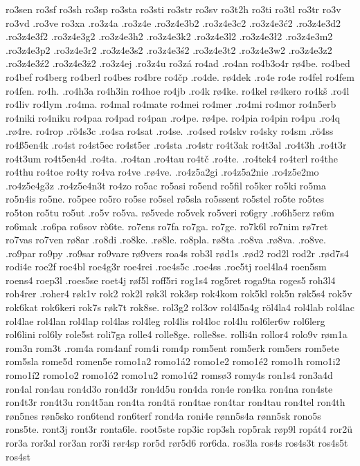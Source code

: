 {{ro3sen
ro3sf
ro3sh
ro3sp
ro3sta
ro3sti
ro3str
ro3sv
ro3t2h
ro3ti
ro3tl
ro3tr
ro3v
ro3vd
.ro3ve
ro3xa
.ro3z4a
.ro3z4e
.ro3z4e3b2
.ro3z4e3c2
.ro3z4e3ć2
.ro3z4e3d2
.ro3z4e3f2
.ro3z4e3g2
.ro3z4e3h2
.ro3z4e3k2
.ro3z4e3l2
.ro3z4e3ł2
.ro3z4e3m2
.ro3z4e3p2
.ro3z4e3r2
.ro3z4e3s2
.ro3z4e3ś2
.ro3z4e3t2
.ro3z4e3w2
.ro3z4e3z2
.ro3z4e3ź2
.ro3z4e3ż2
.ro3z4ej
.ro3z4u
ro3zá
ro4ad
.ro4an
ro4b3o4r
rø4be.
ro4bed
ro4bef
ro4berg
ro4berl
ro4bes
ro4bre
ro4čp
.ro4de.
rø4dek
.ro4e
ro4e
ro4fel
ro4fem
ro4fen.
ro4h.
.ro4h3a
ro4h3in
ro4hoe
ro4jb
.ro4k
rø4ke.
ro4kel
rø4kero
ro4kš
.ro4l
ro4liv
ro4lym
.ro4ma.
ro4mal
ro4mate
ro4mei
ro4mer
.ro4mi
ro4mor
ro4n5erb
ro4niki
ro4niku
ro4paa
ro4pad
ro4pan
.ro4pe.
rø4pe.
ro4pia
ro4pin
ro4pu
.ro4q
.rø4re.
ro4rop
.rö4s3c
.ro4sa
ro4sat
.ro4se.
.ro4sed
ro4skv
ro4sky
ro4sm
.rö4ss
ro4ß5en4k
.ro4st
ro4st5ec
ro4st5er
.ro4sta
.ro4str
ro4t3ak
ro4t3al
.ro4t3h
.ro4t3r
ro4t3um
ro4t5en4d
.ro4ta.
.ro4tan
.ro4tau
ro4tč
.ro4te.
.ro4tek4
ro4terl
ro4the
ro4thu
ro4toe
ro4ty
ro4va
ro4ve
.rø4ve.
.ro4z5a2gi
.ro4z5a2nie
.ro4z5e2mo
.ro4z5e4g3z
.ro4z5e4n3t
ro4zo
ro5ac
ro5asi
ro5end
ro5fil
ro5ker
ro5ki
ro5ma
ro5n4is
ro5ne.
ro5pee
ro5ro
ro5se
ro5sel
rø5sla
ro5ssent
ro5stel
ro5te
ro5tes
ro5ton
ro5tu
ro5ut
.ro5v
ro5va.
rø5vede
ro5vek
ro5veri
ro6gry
.ro6h5erz
rø6m
ro6mak
.ro6pa
ro6sov
rò6te.
ro7ens
ro7fa
ro7ga.
ro7ge.
ro7k6l
ro7nim
rø7ret
ro7vas
ro7ven
rø8ar
.ro8di
.ro8ke.
.rø8le.
ro8pla.
rø8ta
.ro8va
.rø8va.
.ro8ve.
.ro9par
ro9py
.ro9sar
ro9vare
rø9vers
roa4s
rob3l
rød1s
.rød2
rod2l
rod2r
.rød7s4
rodi4e
roe2f
roe4bl
roe4g3r
roe4rei
.roe4s5c
.roe4ss
.roe5tj
roel4la4
roen5sm
roens4
roep3l
.roes5se
roet4j
røf5l
roff5ri
rog1s4
rog5ret
roga9ta
roges5
roh3l4
roh4rer
.roher4
røk1v
rok2
rok2l
røk3l
rok3sp
rok4kom
rok5kl
rok5n
røk5s4
rok5v
rok6kat
rok6keri
rok7s
røk7t
rok8se.
rol3g2
rol3ov
rol4l5a4g
röl4la4
rol4lab
rol4lac
rol4lae
rol4lan
rol4lap
rol4las
rol4leg
rol4lis
rol4loc
rol4lu
rol6ler6w
rol6lerg
rol6lini
rol6ly
role5st
roli7ga
rolle4
rolle8ge.
rolle8se.
rolli4n
rollor4
rolo9v
røm1a
rom3n
rom3t
.rom4a
rom4anf
rom4i
rom4p
rom5ent
rom5erk
rom5ers
rom5ete
rom5sla
rome5d
romen5e
romo1a2
romo1á2
romo1e2
romo1é2
romo1h
romo1i2
romo1í2
romo1o2
romo1ó2
romo1u2
romo1ú2
romsø3
romy4s
ron1s4
ron3a4d
ron4al
ron4au
ron4d3o
ron4d3r
ron4d5u
ron4da
ron4e
ron4ka
ron4na
ron4ste
ron4t3r
ron4t3u
ron4t5an
ron4ta
ron4tä
ron4tae
ron4tar
ron4tau
ron4tel
ron4th
røn5nes
røn5sko
ron6tend
ron6terf
rond4a
roni4e
rønn5s4a
rønn5sk
rono5s
rons5te.
ront3j
ront3r
ronta6le.
root5ste
rop3ic
rop3sh
rop5rak
røp9l
ropát4
ror2ü
ror3a
ror3al
ror3an
ror3i
rør4sp
ror5d
rør5d6
ror6da.
ros3la
ros4s
ros4s3t
ros4s5t
ros4st
}}
